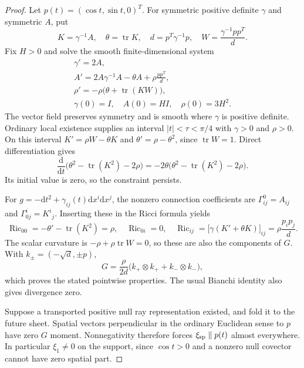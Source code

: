 \documentclass[11pt,a4paper]{article}
\numberwithin{equation}{section}
\newcommand{\Ric}{\operatorname{Ric}}
\newcommand{\tr}{\operatorname{tr}}
\newcommand{\dd}{\mathrm d}
\newcommand{\f}[2]{\frac{#1}{#2}}
\theoremstyle{definition}
\begin{document}
\begin{proof}
Let $p(t)=(\cos t,\sin t,0)^T$. For symmetric positive definite $\gamma$ and symmetric $A$, put
\begin{equation*}
K=\gamma^{-1}A,\quad\theta=\tr K,\quad d=p^T\gamma^{-1}p,\quad
W=\f{\gamma^{-1}pp^T}{d}.
\end{equation*}
Fix $H>0$ and solve the smooth finite-dimensional system
\begin{equation*}
\begin{gathered}
\gamma'=2A,\\
A'=2A\gamma^{-1}A-\theta A+\rho\f{pp^T}{d},\\
\rho'=-\rho\bigl(\theta+\tr(KW)\bigr),\\
\gamma(0)=I,\quad A(0)=HI,\quad\rho(0)=3H^2.
\end{gathered}
\end{equation*}
The vector field preserves symmetry and is smooth where $\gamma$ is positive definite. Ordinary local existence supplies an interval $|t|<\tau<\pi/4$ with $\gamma>0$ and $\rho>0$. On this interval $K'=\rho W-\theta K$ and $\theta'=\rho-\theta^2$, since $\tr W=1$. Direct differentiation gives
\begin{equation*}
\f{\dd}{\dd t}\bigl(\theta^2-\tr(K^2)-2\rho\bigr)
=-2\theta\bigl(\theta^2-\tr(K^2)-2\rho\bigr).
\end{equation*}
Its initial value is zero, so the constraint persists.

For $g=-\dd t^2+\gamma_{ij}(t)\dd x^i\dd x^j$, the nonzero connection coefficients are $\Gamma^0_{ij}=A_{ij}$ and $\Gamma^i_{0j}=K^i{}_j$. Inserting these in the Ricci formula yields
\begin{equation*}
\Ric_{00}=-\theta'-\tr(K^2)=\rho,\quad
\Ric_{0i}=0,\quad
\Ric_{ij}=\bigl[\gamma(K'+\theta K)\bigr]_{ij}=\rho\f{p_ip_j}{d}.
\end{equation*}
The scalar curvature is $-\rho+\rho\tr W=0$, so these are also the components of $G$. With $k_\pm=(-\sqrt d,\pm p)$,
\begin{equation*}
G=\f{\rho}{2d}\bigl(k_+\otimes k_++k_-\otimes k_-\bigr),
\end{equation*}
which proves the stated pointwise properties. The usual Bianchi identity also gives divergence zero.

Suppose a transported positive null ray representation existed, and fold it to the future sheet. Spatial vectors perpendicular in the ordinary Euclidean sense to $p$ have zero $G$ moment. Nonnegativity therefore forces $\xi_{\rm sp}\parallel p(t)$ almost everywhere. In particular $\xi_1\ne0$ on the support, since $\cos t>0$ and a nonzero null covector cannot have zero spatial part.


\end{proof}
\end{document}
